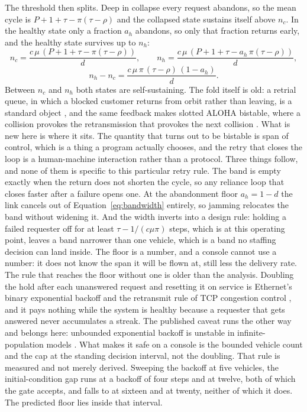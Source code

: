 \documentclass[11pt]{article}
\begin{document}
The threshold then splits. Deep in collapse every request abandons, so the mean cycle is $P + 1 + \tau - \pi(\tau - \rho)$ and the collapsed state sustains itself above $n_c$. In the healthy state only a fraction $a_h$ abandons, so only that fraction returns early, and the healthy state survives up to $n_h$:
\begin{equation}
n_c = \frac{c\,\mu\,(P + 1 + \tau - \pi(\tau-\rho))}{d}, \qquad
n_h = \frac{c\,\mu\,(P + 1 + \tau - a_h\,\pi(\tau-\rho))}{d},
\label{eq:band}
\end{equation}
\begin{equation}
n_h - n_c = \frac{c\,\mu\,\pi\,(\tau-\rho)\,(1 - a_h)}{d}.
\label{eq:bandwidth}
\end{equation}
Between $n_c$ and $n_h$ both states are self-sustaining. The fold itself is old: a retrial queue, in which a blocked customer returns from orbit rather than leaving, is a standard object \citep{falin1990retrial}, and the same feedback makes slotted ALOHA bistable, where a collision provokes the retransmission that provokes the next collision \citep{carleial1975bistable}. What is new here is where it sits. The quantity that turns out to be bistable is span of control, which is a thing a program actually chooses, and the retry that closes the loop is a human-machine interaction rather than a protocol. Three things follow, and none of them is specific to this particular retry rule. The band is empty exactly when the return does not shorten the cycle, so any reliance loop that closes faster after a failure opens one. At the abandonment floor $a_h = 1-d$ the link cancels out of Equation~\ref{eq:bandwidth} entirely, so jamming relocates the band without widening it. And the width inverts into a design rule: holding a failed requester off for at least $\tau - 1/(c\mu\pi)$ steps, which is \qBandFloor{} at this operating point, leaves a band narrower than one vehicle, which is a band no staffing decision can land inside. The floor is a number, and a console cannot use a number: it does not know the span it will be flown at, still less the delivery rate. The rule that reaches the floor without one is older than the analysis. Doubling the hold after each unanswered request and resetting it on service is Ethernet's binary exponential backoff \citep{metcalfe1976ethernet} and the retransmit rule of TCP congestion control \citep{jacobson1988congestion}, and it pays nothing while the system is healthy because a requester that gets answered never accumulates a streak. The published caveat runs the other way and belongs here: unbounded exponential backoff is unstable in infinite-population models \citep{aldous1987instability,hastad1996backoff}. What makes it safe on a console is the bounded vehicle count and the cap at the standing decision interval, not the doubling. That rule is measured and not merely derived. Sweeping the backoff at five vehicles, the initial-condition gap runs \qFloorFour{} at a backoff of four steps and \qFloorTwelve{} at twelve, both of which the gate accepts, and falls to \qFloorSixteen{} at sixteen and \qFloorTwenty{} at twenty, neither of which it does. The predicted floor lies inside that interval.
\end{document}
